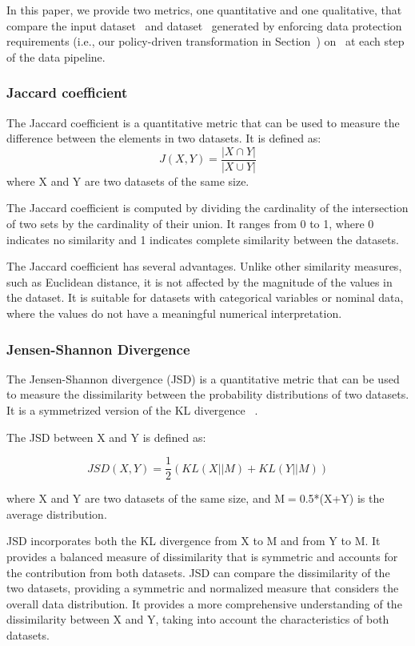 In this paper, we provide two metrics, one quantitative and one qualitative, that compare the input dataset \origdataset\ and dataset \transdataset\ generated by enforcing data protection requirements (i.e., our policy-driven transformation in Section~\cite{ADD}) on \origdataset\ at each step of the data pipeline.

\subsubsection{Jaccard coefficient}
The Jaccard coefficient is a quantitative metric that can be used to measure the difference between the elements in two datasets.
It is defined as:\[J(X,Y) = \frac{|X \cap Y|}{|X \cup Y|}\]
where X and Y are two datasets of the same size.

The Jaccard coefficient is computed by dividing the cardinality of the intersection of two sets by the cardinality of their union. It ranges from 0 to 1, where 0 indicates no similarity and 1 indicates complete similarity between the datasets.

The Jaccard coefficient has several advantages. Unlike other similarity measures, such as Euclidean distance, it is not affected by the magnitude of the values in the dataset. It is suitable for datasets with categorical variables or nominal data, where the values do not have a meaningful numerical interpretation.


\subsubsection{Jensen-Shannon Divergence}
The Jensen-Shannon divergence (JSD) is a quantitative metric that can be used to measure the dissimilarity between the probability distributions of two datasets. It is a symmetrized version of the KL divergence~\cite{ADD} .

The JSD between X and Y  is defined as:

\[JSD(X, Y) = \frac{1}{2} \left( KL(X || M)
  + KL(Y || M) \right)\]

where X and Y are two datasets of the same size, and M$=$0.5*(X+Y) is the average distribution.

JSD incorporates both the KL divergence from X to M and from Y to M. It provides a balanced measure of dissimilarity that is symmetric and accounts for the contribution from both datasets.
%
JSD can compare the dissimilarity of the two datasets, providing a symmetric and normalized measure that considers the overall data distribution.
%
It provides a more comprehensive understanding of the dissimilarity between X and Y, taking into account the characteristics of both datasets.


